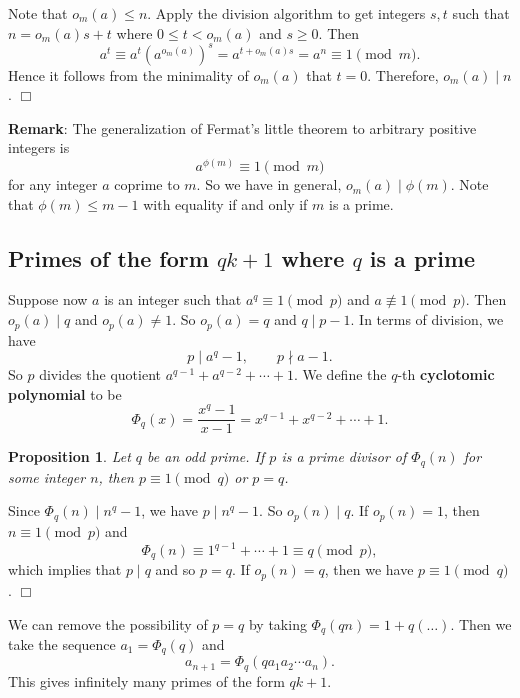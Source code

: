 \documentclass{article}
\newtheorem{proposition}[subsection]{Proposition}
\newenvironment{proof}{\noindent {\bf Proof:}}{$\Box$ \vspace{2 ex}}
\begin{document}
\begin{proof}
    Note that $o_m(a)\leq n$. Apply the division algorithm to get integers $s,t$ such that $n = o_m(a)s + t$ where $0\leq t < o_m(a)$ and $s\geq 0$. Then
$$a^t \equiv a^t (a^{o_m(a)})^s = a^{t + o_m(a)s} = a^{n}\equiv 1\pmod{m}.$$
Hence it follows from the minimality of $o_m(a)$ that $t = 0$. Therefore, $o_m(a)\mid n$.
\end{proof}

\noindent\textbf{Remark}: The generalization of Fermat's little theorem to arbitrary positive integers is $$a^{\phi(m)}\equiv 1\pmod{m}$$
for any integer $a$ coprime to $m$. So we have in general, $o_m(a)\mid \phi(m)$. Note that $\phi(m) \leq m - 1$ with equality if and only if $m$ is a prime.

\subsection*{Primes of the form $qk+1$ where $q$ is a prime}

Suppose now $a$ is an integer such that $a^q\equiv 1\pmod{p}$ and $a\not\equiv 1\pmod{p}$. Then $o_p(a)\mid q$ and $o_p(a)\neq 1$. So $o_p(a)=q$ and $q\mid p-1$. In terms of division, we have
$$p\mid a^q - 1,\qquad p\nmid a - 1.$$
So $p$ divides the quotient $a^{q-1} + a^{q-2} + \cdots + 1$. We define the $q$-th \textbf{cyclotomic polynomial} to be
$$\Phi_q(x) = \frac{x^q - 1}{x - 1} = x^{q-1} + x^{q-2} + \cdots + 1.$$

\begin{proposition}
    Let $q$ be an odd prime. If $p$ is a prime divisor of $\Phi_q(n)$ for some integer $n$, then $p\equiv 1\pmod{q}$ or $p=q$.
\end{proposition}


\begin{proof}
    Since $\Phi_q(n)\mid n^q - 1$, we have $p\mid n^q - 1$. So $o_p(n)\mid q$. If $o_p(n) = 1$, then $n\equiv 1\pmod{p}$ and $$\Phi_q(n) \equiv 1^{q-1} + \cdots + 1 \equiv q\pmod{p},$$
    which implies that $p\mid q$ and so $p=q$. If $o_p(n) = q$, then we have $p\equiv 1\pmod{q}$.
\end{proof}

We can remove the possibility of $p=q$ by taking $\Phi_q(qn) = 1 + q(\ldots).$ Then we take the sequence $a_1 = \Phi_q(q)$ and $$a_{n+1} = \Phi_q(qa_1a_2\cdots a_n).$$
This gives infinitely many primes of the form $qk+1$.
\end{document}
